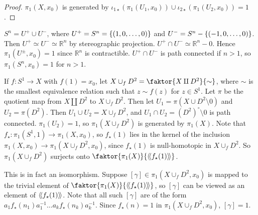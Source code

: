 \begin{proof}
	\( \pi_1(X,x_0) \) is generated by \( \iota_{1\star}(\pi_1(U_1,x_0)) \cup \iota_{2\star}(\pi_1(U_2,x_0)) = \qty{1} \).
\end{proof}
\begin{example}
	\( S^n = U^+ \cup U^- \), where \( U^+ = S^n = \qty{\qty(1, 0, \dots, 0)} \) and \( U^- = S^n - \qty{\qty(-1,0,\dots,0)} \).
	Then \( U^+ \simeq U^- \simeq \mathbb R^n \) by stereographic projection.
	\( U^+ \cap U^- \simeq \mathbb R^n - \qty{0} \).
	Hence \( \pi_1(U^\pm, x_0) = 1 \) since \( \mathbb R^n \) is contractible.
	\( U^+ \cap U^- \) is path connected if \( n > 1 \), so \( \pi_1(S^n, x_0) = 1 \) for \( n > 1 \).
\end{example}
\begin{example}
	If \( f \colon S^1 \to X \) with \( f(1) = x_0 \), let \( X \cup_f D^2 = \faktor{X \amalg D^2}{\sim} \), where \( \sim \) is the smallest equivalence relation such that \( z \sim f(z) \) for \( z \in S^1 \).
	Let \( \pi \) be the quotient map from \( X \amalg D^2 \) to \( X \cup_f D^2 \).
	Then let \( U_1 = \pi(X \cup D^2 \setminus \qty{0}) \) and \( U_2 = \pi(D^2) \).
	Then \( U_1 \cup U_2 = X \cup_f D^2 \), and \( U_1 \cap U_2 = (D^2)^\circ \setminus \qty{0} \) is path connected.
	\( \pi_1(U_2) = 1 \), so \( \pi_1(X \cup_f D^2) \) is generated by \( \pi_1(X) \).
	Note that \( f_\star \colon \pi_1(S^1, 1) \to \pi_1(X,x_0) \), so \( f_\star(1) \) lies in the kernel of the inclusion \( \pi_1(X,x_0) \to \pi_1(X \cup_f D^2, x_0) \), since \( f_\star(1) \) is null-homotopic in \( X \cup_f D^2 \).
	So \( \pi_1(X \cup_f D^2) \) surjects onto \( \faktor{\pi_1(X)}{\ngenset{f_\star(1)}} \).

	This is in fact an isomorphism.
	Suppose \( [\gamma] \in \pi_1(X \cup_f D^2, x_0) \) is mapped to the trivial element of \( \faktor{\pi_1(X)}{\ngenset{f_\star(1)}} \), so \( [\gamma] \) can be viewed as an element of \( \left\langle\!\left\langle{} f_\star(1) \right\rangle\!\right\rangle \).
	Note that all such \( [\gamma] \) are of the form \( a_1 f_\star(n_1) a_1^{-1} \dots a_k f_\star(n_k) a_k^{-1} \).
	Since \( f_\star(n) = 1 \) in \( \pi_1(X \cup_f D^2, x_0) \), \( [\gamma] = 1 \).
\end{example}

